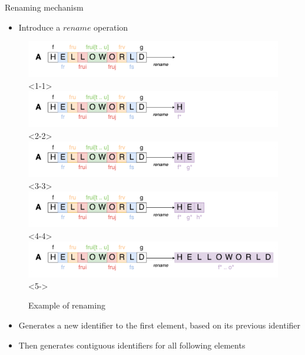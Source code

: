 \documentclass[10pt]{beamer}
\begin{document}
\begin{frame}{Renaming mechanism}
  \begin{itemize}
    \item Introduce a $rename$ operation
  \end{itemize}
  \begin{figure}
    \includegraphics[scale=0.11]{img/renaming-1.png}<1-1>
    \includegraphics[scale=0.11]{img/renaming-2.png}<2-2>
    \includegraphics[scale=0.11]{img/renaming-3.png}<3-3>
    \includegraphics[scale=0.11]{img/renaming-4.png}<4-4>
    \includegraphics[scale=0.11]{img/renaming-5.png}<5->
    \caption{Example of renaming}
  \end{figure}
  \begin{itemize}
    \item<2-> Generates a new identifier to the first element, based on its previous identifier
    \item<3-> Then generates contiguous identifiers for all following elements
  \end{itemize}
\end{frame}
\end{document}
